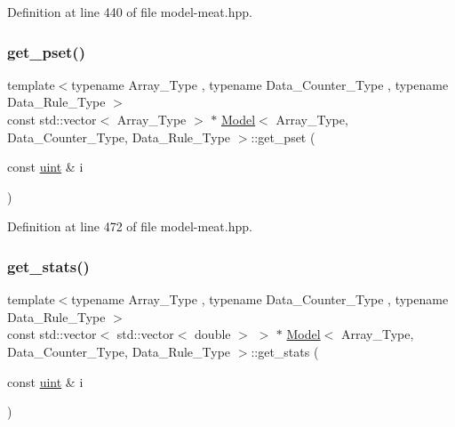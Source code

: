 Definition at line 440 of file model-\/meat.\+hpp.

\mbox{\label{class_model_ad09221a8938765deec2c9d4d0fa8dec5}} 
\subsubsection{\texorpdfstring{get\+\_\+pset()}{get\_pset()}}
{\footnotesize\ttfamily template$<$typename Array\+\_\+\+Type , typename Data\+\_\+\+Counter\+\_\+\+Type , typename Data\+\_\+\+Rule\+\_\+\+Type $>$ \\
const std\+::vector$<$ Array\+\_\+\+Type $>$ $\ast$ \hyperlink{class_model}{Model}$<$ Array\+\_\+\+Type, Data\+\_\+\+Counter\+\_\+\+Type, Data\+\_\+\+Rule\+\_\+\+Type $>$\+::get\+\_\+pset (\begin{DoxyParamCaption}\item[{const \hyperlink{typedefs_8hpp_a91ad9478d81a7aaf2593e8d9c3d06a14}{uint} \&}]{i }\end{DoxyParamCaption})\hspace{0.3cm}{\ttfamily [inline]}}



Definition at line 472 of file model-\/meat.\+hpp.

\mbox{\label{class_model_adde1cf74eb0ca7f771b7878af9766cdf}} 
\subsubsection{\texorpdfstring{get\+\_\+stats()}{get\_stats()}}
{\footnotesize\ttfamily template$<$typename Array\+\_\+\+Type , typename Data\+\_\+\+Counter\+\_\+\+Type , typename Data\+\_\+\+Rule\+\_\+\+Type $>$ \\
const std\+::vector$<$ std\+::vector$<$ double $>$ $>$ $\ast$ \hyperlink{class_model}{Model}$<$ Array\+\_\+\+Type, Data\+\_\+\+Counter\+\_\+\+Type, Data\+\_\+\+Rule\+\_\+\+Type $>$\+::get\+\_\+stats (\begin{DoxyParamCaption}\item[{const \hyperlink{typedefs_8hpp_a91ad9478d81a7aaf2593e8d9c3d06a14}{uint} \&}]{i }\end{DoxyParamCaption})\hspace{0.3cm}{\ttfamily [inline]}}



